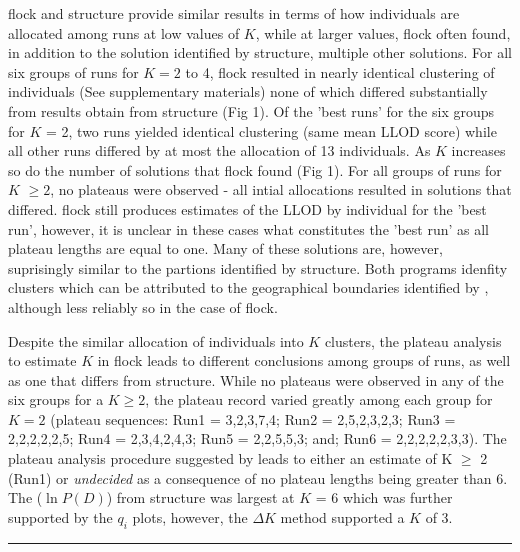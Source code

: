 {\sc flock} and {\sc structure} provide similar results in 
terms of how individuals are allocated among runs at low values of $K$, 
while at larger values, {\sc flock} often found, in addition to the solution identified by {\sc structure}, 
multiple other solutions. For all six groups 
of runs for $K = 2$ to 4, {\sc flock} resulted in nearly identical clustering of individuals 
(See supplementary materials) none of which differed substantially from results obtain from 
{\sc structure} (Fig 1). Of the 'best runs' for the six groups for $K$ = 2, two  
runs yielded identical clustering (same mean LLOD score) while all other runs 
differed by at most the allocation of 13 individuals. As 
$K$ increases so do the number of solutions
that {\sc flock} found (Fig 1). For all groups of runs for $K$ $\geq 2$, no plateaus were observed - all intial 
allocations resulted in solutions that differed. 
{\sc flock} still produces estimates of the LLOD by individual for the 
'best run', however, it is unclear in these cases what constitutes the 'best run' as all plateau lengths are 
equal to one. Many of these solutions are, however, suprisingly similar to
 the partions identified by {\sc structure}. Both programs idenfity clusters 
which can be attributed to the geographical boundaries identified by \citet{Garzaetal_norcal},
although less reliably so in the case of {\sc flock}.

Despite the similar allocation of individuals into $K$ clusters, the 
plateau analysis to estimate $K$ in {\sc flock} leads to different conclusions among groups of runs, as well as 
one that differs from {\sc structure}. While no plateaus were observed in any of the six groups 
for a $K\geq 2$, the plateau record varied greatly among each
group for $K = 2$ (plateau sequences: Run1 = 3,2,3,7,4; Run2 = 2,5,2,3,2,3; Run3 = 2,2,2,2,2,5; 
Run4 = 2,3,4,2,4,3; Run5 = 2,2,5,5,3; and; Run6 = 2,2,2,2,2,3,3). The plateau analysis 
procedure suggested by \citet{Duc&Tur2012} leads to
either an estimate of K $\geq$ 2 (Run1) or {\em undecided} as a consequence of no plateau 
lengths being greater than 6. The ($\ln P(D)$) from {\sc structure}
was largest at $K$ = 6 which was further supported by the $q_i$ plots, however,
the $\Delta K$ method supported a $K$ of 3.
 
\hrule


